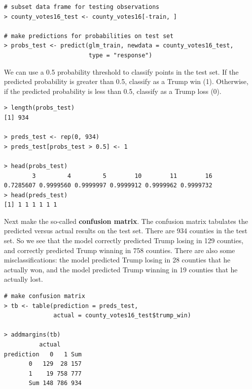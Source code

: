 \documentclass[10pt]{beamer}\usepackage[]{graphicx}\usepackage[]{color}
\begin{document}
\begin{frame}[fragile]
\small
\begin{verbatim}
# subset data frame for testing observations
> county_votes16_test <- county_votes16[-train, ]

# make predictions for probabilities on test set
> probs_test <- predict(glm_train, newdata = county_votes16_test,
                        type = "response")
\end{verbatim}
\end{frame}

\begin{frame}[fragile]
We can use a 0.5 probability threshold to classify points in the test set.  If the predicted probability is greater than 0.5, classify as a Trump win (1). Otherwise, if the predicted probability is less than 0.5, classify as a Trump loss (0).  
\small
\begin{verbatim}
> length(probs_test)
[1] 934

> preds_test <- rep(0, 934) 
> preds_test[probs_test > 0.5] <- 1
 
> head(probs_test) 
        3         4         5        10        11        16 
0.7285607 0.9999560 0.9999997 0.9999912 0.9999962 0.9999732 
> head(preds_test) 
[1] 1 1 1 1 1 1
\end{verbatim}
\end{frame}

\begin{frame}[fragile]
Next make the so-called \textbf{confusion matrix}.  The confusion matrix tabulates the predicted versus actual results on the test set.  There are 934 counties in the test set.  So we see that the model correctly predicted Trump losing in 129 counties, and correctly predicted Trump winning in 758 counties. There are also some misclassifications: the model predicted Trump losing in 28 counties that he actually won, and the model predicted Trump winning in 19 counties that he actually lost.
\begin{verbatim}
# make confusion matrix
> tb <- table(prediction = preds_test,
              actual = county_votes16_test$trump_win)
              
> addmargins(tb)
          actual
prediction   0   1 Sum
       0   129  28 157
       1    19 758 777
       Sum 148 786 934
\end{verbatim}
\end{frame}
\end{document}
